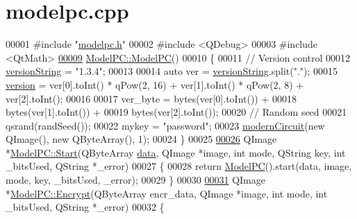 \hypertarget{modelpc_8cpp_source}{\section{modelpc.\-cpp}
}

\begin{DoxyCode}
00001 \textcolor{preprocessor}{#include "\hyperlink{modelpc_8h}{modelpc.h}"}
00002 \textcolor{preprocessor}{#include <QDebug>}
00003 \textcolor{preprocessor}{#include <QtMath>}
\hypertarget{modelpc_8cpp_source_l00009}{}\hyperlink{class_model_p_c_ae12ebe65ec973c02a0de4850a7c1e31c}{00009} \hyperlink{class_model_p_c_ae12ebe65ec973c02a0de4850a7c1e31c}{ModelPC::ModelPC}()
00010 \{
00011     \textcolor{comment}{// Version control}
00012     \hyperlink{class_model_p_c_a5f426725ccf7eefd3c77ea8c720264c9}{versionString} = \textcolor{stringliteral}{"1.3.4"};
00013 
00014     \textcolor{keyword}{auto} ver = \hyperlink{class_model_p_c_a5f426725ccf7eefd3c77ea8c720264c9}{versionString}.split(\textcolor{stringliteral}{"."});
00015     \hyperlink{class_model_p_c_a5af48ab89e19be42a94c34ba00249401}{version} = ver[0].toInt() * qPow(2, 16) + ver[1].toInt() * qPow(2, 8) + ver[2].toInt();
00016 
00017     ver\_byte = bytes(ver[0].toInt()) +
00018             bytes(ver[1].toInt()) +
00019             bytes(ver[2].toInt());
00020     \textcolor{comment}{// Random seed}
00021     qsrand(randSeed());
00022     mykey = \textcolor{stringliteral}{"password"};
00023     \hyperlink{class_model_p_c_a670c3a08360555282adfd3740b2debac}{modernCircuit}(\textcolor{keyword}{new} QImage(), \textcolor{keyword}{new} QByteArray(), 1);
00024 \}
00025 
\hypertarget{modelpc_8cpp_source_l00026}{}\hyperlink{class_model_p_c_a77a3beaa87ab7d882215730c546a1c91}{00026} QImage *\hyperlink{class_model_p_c_a77a3beaa87ab7d882215730c546a1c91}{ModelPC::Start}(QByteArray \hyperlink{namespace_errors_dict_setup_adf4c30d205d29df7343e26f7c62b0685}{data}, QImage *image, \textcolor{keywordtype}{int} mode, QString key, \textcolor{keywordtype}{int} 
      \_bitsUsed, QString *\_error)
00027 \{
00028     \textcolor{keywordflow}{return} \hyperlink{class_model_p_c_ae12ebe65ec973c02a0de4850a7c1e31c}{ModelPC}().start(data, image, mode, key, \_bitsUsed, \_error);
00029 \}
00030 
\hypertarget{modelpc_8cpp_source_l00031}{}\hyperlink{class_model_p_c_a132a399bf401a97106c2368e6e9e8792}{00031} QImage *\hyperlink{class_model_p_c_a132a399bf401a97106c2368e6e9e8792}{ModelPC::Encrypt}(QByteArray encr\_data, QImage *image, \textcolor{keywordtype}{int} mode, \textcolor{keywordtype}{int} \_bitsUsed, 
      QString *\_error)
00032 \{

\end{DoxyCode}
